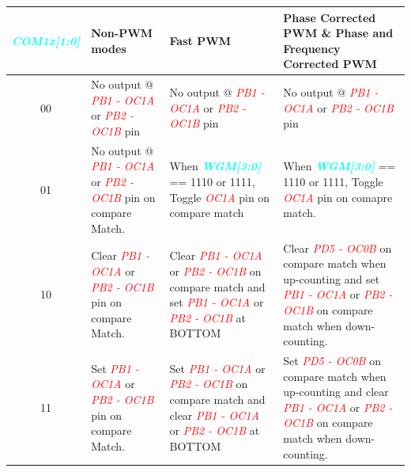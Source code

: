 \documentclass{article}
\newcommand{\bitFormat}[1]{\emph{\textbf{\textcolor{cyan}{#1}}}}
\newcommand{\pinFormat}[1]{\emph{\textcolor{red}{#1}}}
\begin{document}
\begin{table}[H]
    \begin{center}
        \begin{tabular}{c|p{4.1cm}|p{4.5cm}|p{4.9cm}}
            \bitFormat{COM1x[1:0]} & \textbf{Non-PWM modes} & \textbf{Fast PWM} & \textbf{Phase Corrected PWM \& Phase and Frequency Corrected PWM}\\
            \hline
            00 & No output @ \pinFormat{PB1 - OC1A} or \pinFormat{PB2 - OC1B} pin &   No output @ \pinFormat{PB1 - OC1A} or \pinFormat{PB2 - OC1B} pin & No output @ \pinFormat{PB1 - OC1A} or \pinFormat{PB2 - OC1B} pin \\
            \hline
            01 &  No output @ \pinFormat{PB1 - OC1A} or \pinFormat{PB2 - OC1B} pin on compare Match. & When \bitFormat{WGM[3:0]} == 1110 or 1111, Toggle \pinFormat{OC1A} pin on compare match & When \bitFormat{WGM[3:0]} == 1110 or 1111, Toggle \pinFormat{OC1A} pin on comapre match.\\
            \hline
            10 & Clear \pinFormat{PB1 - OC1A} or \pinFormat{PB2 - OC1B} pin on compare Match. & Clear \pinFormat{PB1 - OC1A} or \pinFormat{PB2 - OC1B} on compare match and  set \pinFormat{PB1 - OC1A} or \pinFormat{PB2 - OC1B} at BOTTOM & Clear \pinFormat{PD5 - OC0B} on compare match when up-counting and set \pinFormat{PB1 - OC1A} or \pinFormat{PB2 - OC1B} on compare match when down-counting.\\
            \hline
            11 & Set \pinFormat{PB1 - OC1A} or \pinFormat{PB2 - OC1B} pin on compare Match. & Set \pinFormat{PB1 - OC1A} or \pinFormat{PB2 - OC1B} on compare match and clear \pinFormat{PB1 - OC1A} or \pinFormat{PB2 - OC1B} at BOTTOM & Set \pinFormat{PD5 - OC0B} on compare match when up-counting and clear \pinFormat{PB1 - OC1A} or \pinFormat{PB2 - OC1B} on compare match when down-counting.\\
        \end{tabular}
    \end{center}
\end{table}
\end{document}
